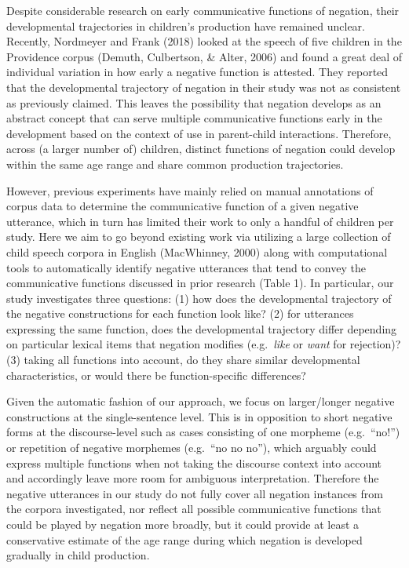 \documentclass[
  english,
  man,floatsintext]{apa6}
\begin{document}
Despite considerable research on early communicative functions of negation, their developmental trajectories in children's production have remained unclear. Recently, Nordmeyer and Frank (2018) looked at the speech of five children in the Providence corpus (Demuth, Culbertson, \& Alter, 2006) and found a great deal of individual variation in how early a negative function is attested. They reported that the
developmental trajectory of negation in their study was not as consistent as previously claimed. This leaves the possibility that negation develops as an abstract concept that can serve multiple communicative functions early in the development based on the context of use in parent-child interactions. Therefore, across (a larger number of) children, distinct functions of negation could develop within the same age range and share common production trajectories.

However, previous experiments have mainly relied on manual annotations of corpus data to determine the communicative function of a given negative utterance, which in turn has limited their work to only a handful of children per study.
Here we aim to go beyond existing work via utilizing a large collection of child speech corpora in English (MacWhinney, 2000) along with computational tools to automatically identify negative utterances that tend to convey the communicative functions discussed in prior research (Table 1). In particular, our study investigates three questions: (1) how does the developmental trajectory of the negative constructions for each function look like? (2) for utterances expressing the same function, does the developmental trajectory differ depending on particular lexical items that negation modifies (e.g.~\emph{like} or \emph{want} for rejection)? (3) taking all functions into account, do they share similar developmental characteristics, or would there be function-specific differences?

Given the automatic fashion of our approach, we focus on larger/longer negative constructions at the single-sentence level. This is in opposition to short negative forms at the discourse-level such as cases consisting of one morpheme (e.g.~\enquote{no!}) or repetition of negative morphemes (e.g.~\enquote{no no no}), which arguably could express multiple functions when not taking the discourse context into account and accordingly leave more room for ambiguous interpretation. Therefore the negative utterances in our study do not fully cover all negation instances from the corpora investigated, nor reflect all possible communicative functions that could be played by negation more broadly, but it could provide at least a conservative estimate of the age range during which negation is developed gradually in child production.
\end{document}
